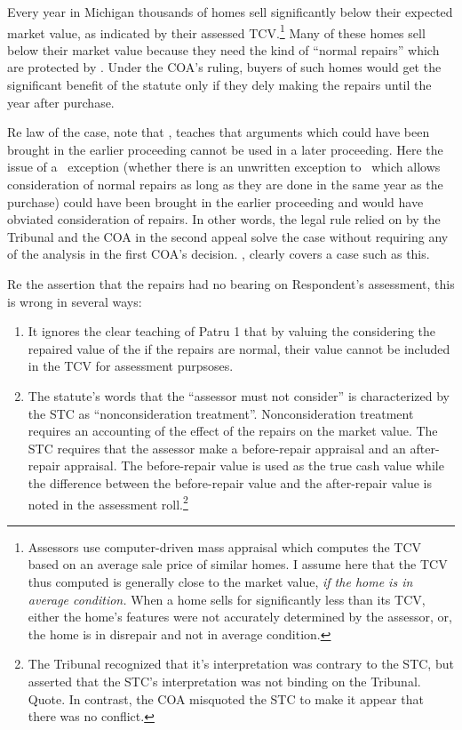 \documentclass[12pt,\documentclassflag]{michiganCourtOfAppealsBrief}
\begin{document}
\begin{todolist}
  Every year in Michigan thousands of homes sell significantly below their expected market value, as indicated by their assessed TCV.\footnote{Assessors use computer-driven mass appraisal which computes the TCV based on an average sale price of similar homes. I assume here that the TCV thus computed is generally close to the market value, \emph{if the home is in average condition.}  When a home sells for significantly less than its TCV, either the home's features were not accurately determined by the assessor, or, the home is in disrepair and not in average condition.} Many of these homes sell below their market value because they need the kind of ``normal repairs'' which are protected by \mathieuGast. Under the COA's ruling, buyers of such homes would get the significant benefit of the statute only if they dely making the repairs until the year after purchase. 

  Re law of the case, note that \cite{Bennett}, teaches that arguments which could have been brought in the earlier proceeding cannot be used in a later proceeding. Here the issue of a \mathieuGast\ exception (whether there is an unwritten exception to \mathieuGast\ which allows consideration of normal repairs as long as they are done in the same year as the purchase) could have been brought in the earlier proceeding and would have obviated consideration of repairs. In other words, the legal rule relied on by the Tribunal and the COA in the second appeal solve the case without requiring any of the analysis in the first COA's decision. \cite{Bennett}, clearly covers a case such as this.

  Re the assertion that the repairs had no bearing on Respondent's assessment, this is wrong in several ways:
  \begin{enumerate}
    \item It ignores the clear teaching of Patru 1 that by valuing the considering the repaired value of the  if the repairs are normal, their value cannot be included in the TCV for assessment purpsoses.

    \item The statute's words that the ``assessor must not consider'' is characterized by the STC as ``nonconsideration treatment''. Nonconsideration treatment requires an accounting of the effect of the repairs on the market value. The STC requires that the assessor make a before-repair appraisal and an after-repair appraisal. The before-repair value is used as the true cash value while the difference between the before-repair value and the after-repair value is noted in the assessment roll.\footnote{The Tribunal recognized that it's interpretation was contrary to the STC, but asserted that the STC's interpretation was not binding on the Tribunal. Quote. In contrast, the  COA misquoted the STC to make it appear that there was no conflict.}


\end{enumerate}
\end{todolist}
\end{document}
